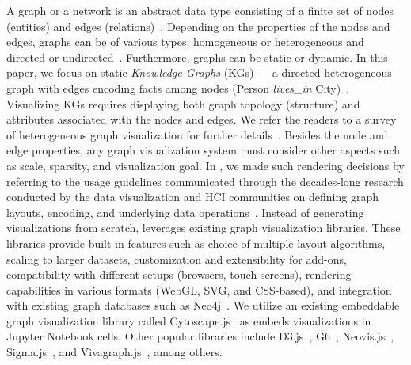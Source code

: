 A graph or a network is an abstract data type consisting of a finite set of nodes (entities) and edges (relations)~\cite{liu2018graph}. Depending on the properties of the nodes and edges, graphs can be of various types: homogeneous or heterogeneous and directed or undirected~\cite{liu2018graph, 2019_eurovis_mvnv}. Furthermore, graphs can be static or dynamic. In this paper, we focus on static \emph{Knowledge Graphs} (KGs) --- a directed heterogeneous graph with edges encoding facts among nodes (\eg Person \emph{lives\_in} City)~\cite{kg2019def}. Visualizing KGs requires displaying both graph topology (\ie structure) and attributes associated with the nodes and edges.
We refer the readers to a survey of heterogeneous graph visualization for further details~\cite{2019_eurovis_mvnv}. Besides the node and edge properties, any graph visualization system must consider other aspects such as scale, sparsity, and visualization goal. In \system, we made such rendering decisions by referring to the usage guidelines communicated through the decades-long research conducted by the data visualization and HCI communities on defining graph layouts, encoding, and underlying data operations~\cite{liu2018graph, 2019_eurovis_mvnv, pienta2015scalable}. 
Instead of generating visualizations from scratch, \system leverages existing graph visualization libraries. 
These libraries provide built-in features such as
choice of multiple layout algorithms, scaling to larger datasets, customization and extensibility for add-ons, compatibility with different setups (\eg browsers, touch screens), rendering capabilities in various formats (\eg WebGL, SVG, and CSS-based), and integration with existing graph databases such as Neo4j~\cite{miller2013graph}. We utilize an existing embeddable graph visualization library called Cytoscape.js~\cite{franz2016cytoscape} as \system embeds visualizations in Jupyter Notebook cells. Other popular libraries include
D3.js~\cite{bostock2011d3}, G6~\cite{g6}, Neovis.js~\cite{neovis},  Sigma.js~\cite{sigmajs}, and Vivagraph.js~\cite{vivagraphjs}, among others.

